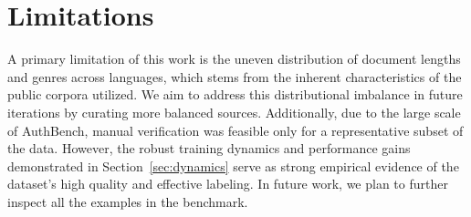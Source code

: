 \documentclass{article}
\begin{document}
\section*{Limitations} A primary limitation of this work is the uneven distribution of document lengths and genres across languages, which stems from the inherent characteristics of the public corpora utilized. We aim to address this distributional imbalance in future iterations by curating more balanced sources. Additionally, due to the large scale of AuthBench, manual verification was feasible only for a representative subset of the data. However, the robust training dynamics and performance gains demonstrated in Section~\ref{sec:dynamics} serve as strong empirical evidence of the dataset's high quality and effective labeling.
In future work, we plan to further inspect all the examples in the benchmark.

\end{document}
